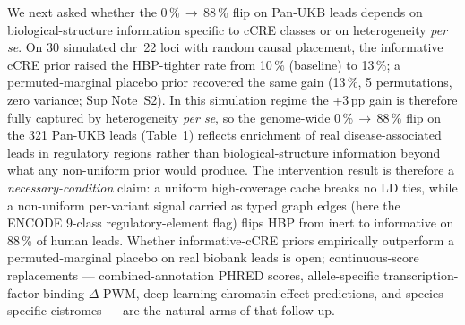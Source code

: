 We next asked whether the 0\,\%\,$\to$\,88\,\% flip on Pan-UKB
leads depends on biological-structure information specific to
cCRE classes or on heterogeneity \emph{per se}. On 30 simulated
chr~22 loci with random causal placement, the informative cCRE
prior raised the HBP-tighter rate from 10\,\% (baseline) to
13\,\%; a permuted-marginal placebo prior recovered the same gain
(13\,\%, 5 permutations, zero variance; Sup Note~S2).
In this simulation regime the +3\,pp gain is therefore fully
captured by heterogeneity \emph{per se}, so the genome-wide
0\,\%\,$\to$\,88\,\% flip on the 321 Pan-UKB leads (Table~1)
reflects enrichment of real disease-associated leads in
regulatory regions rather than biological-structure information
beyond what any non-uniform prior would produce. The intervention
result is therefore a \emph{necessary-condition} claim: a uniform
high-coverage cache breaks no LD ties, while a non-uniform
per-variant signal carried as typed graph edges (here the ENCODE
9-class regulatory-element flag) flips HBP from inert to
informative on 88\,\% of human leads. Whether informative-cCRE
priors empirically outperform a permuted-marginal placebo on real
biobank leads is open; continuous-score replacements ---
combined-annotation PHRED scores, allele-specific
transcription-factor-binding $\Delta$-PWM, deep-learning
chromatin-effect predictions, and species-specific cistromes ---
are the natural arms of that follow-up.

